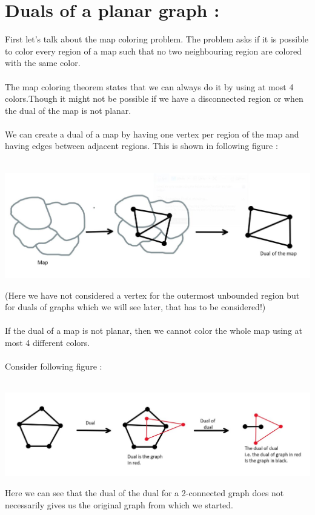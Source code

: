 \documentclass{article}
\begin{document}
    \section*{Duals of a planar graph : }
    First let's talk about the map coloring problem. The problem asks if it is possible to color every region of a map such that no two neighbouring region are colored with the same color.
    \\\\
    The map coloring theorem states that we can always do it by using at most 4 colors.Though it might not be possible if we have a disconnected region or when the dual of the map is not planar. 
    \\\\
    We can create a dual of a map by having one vertex per region of the map and having edges between adjacent regions. This is shown in following figure  :
    \\\\
    \centerline{\includegraphics[width=6in]{Images/map_coloring.JPG}}
    (Here we have not considered a vertex for the outermost unbounded region but for duals of graphs which we will see later, that has to be considered!)
    \\\\
    If the dual of a map is not planar, then we cannot color the whole map using at most 4 different colors.
    \\\\
    Consider following figure : 
    \\\\
    \centerline{\includegraphics[width=6in]{Images/dual_1.JPG}}
    Here we can see that the dual of the dual for a 2-connected graph does not necessarily gives us the original graph from which we started.
\end{document}
